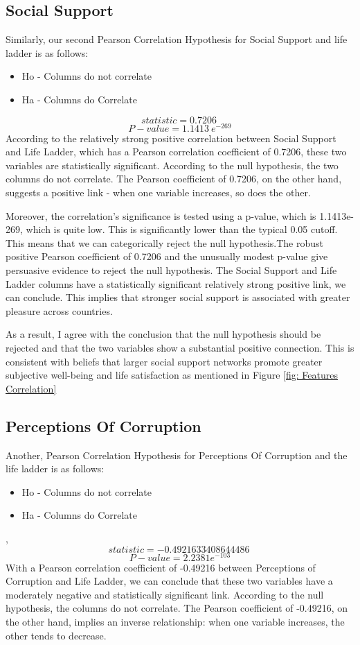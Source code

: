 \documentclass[12pt, a4paper, twoside]{report}
\theoremstyle{plain} %
\theoremstyle{definition} %
\theoremstyle{remark} %
\numberwithin{equation}{chapter}
\begin{document}
\subsection{Social Support}
Similarly, our second Pearson Correlation Hypothesis for Social Support and life ladder is as follows:
\begin{itemize}
    \item Ho - Columns do not correlate
    \item Ha - Columns do Correlate
\end{itemize}

 \[statistic=0.7206\ \]
 \[P-value= 1.1413\ e^{-269}  \]
According to the relatively strong positive correlation between Social Support and Life Ladder, which has a Pearson correlation coefficient of 0.7206, these two variables are statistically significant. According to the null hypothesis, the two columns do not correlate. The Pearson coefficient of 0.7206, on the other hand, suggests a positive link - when one variable increases, so does the other.

Moreover, the correlation's significance is tested using a p-value, which is 1.1413e-269, which is quite low. This is significantly lower than the typical 0.05 cutoff. This means that we can categorically reject the null hypothesis.The robust positive Pearson coefficient of 0.7206 and the unusually modest p-value give persuasive evidence to reject the null hypothesis. The Social Support and Life Ladder columns have a statistically significant relatively strong positive link, we can conclude. This implies that stronger social support is associated with greater pleasure across countries.

As a result, I agree with the conclusion that the null hypothesis should be rejected and that the two variables show a substantial positive connection. This is consistent with beliefs that larger social support networks promote greater subjective well-being and life satisfaction as mentioned in Figure \ref{fig: Features Correlation}

\subsection{Perceptions Of Corruption} 
Another, Pearson Correlation Hypothesis for Perceptions Of Corruption and the life ladder is as follows:
\begin{itemize}
    \item Ho - Columns do not correlate
    \item Ha - Columns do Correlate
\end{itemize}
, 
 \[statistic = -0.4921633408644486\ \]
 \[P-value = 2.2381 e^{-103}  \]
With a Pearson correlation coefficient of -0.49216 between Perceptions of Corruption and Life Ladder, we can conclude that these two variables have a moderately negative and statistically significant link. According to the null hypothesis, the columns do not correlate. The Pearson coefficient of -0.49216, on the other hand, implies an inverse relationship: when one variable increases, the other tends to decrease.
\end{document}

